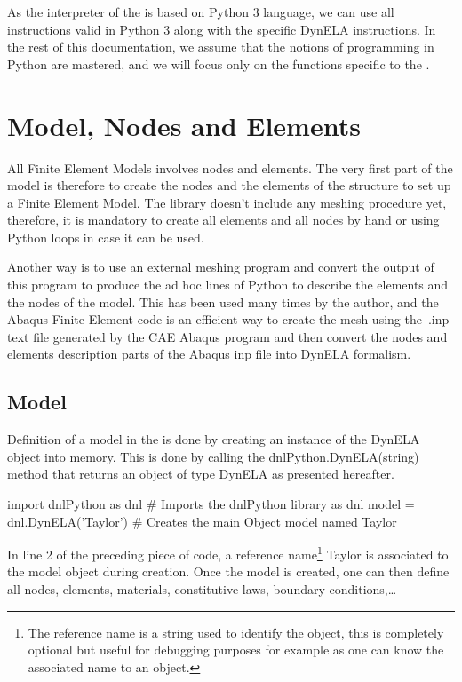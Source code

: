 As the interpreter of the \DynELA is based on Python 3 language, we can use all instructions valid in Python 3 along with the specific DynELA instructions. In the rest of this documentation, we assume that the notions of programming in Python are mastered, and we will focus only on the functions specific to the \DynELA.


\section{Model, Nodes and Elements}

All Finite Element Models involves nodes and elements. The very first part of the model is therefore to create the nodes and the elements of the structure to set up a Finite Element Model. The \DynELA library doesn't include any meshing procedure yet, therefore, it is mandatory to create all elements and all nodes by hand or using Python loops in case it can be used.

Another way is to use an external meshing program and convert the output of this program to produce the ad hoc lines of Python to describe the elements and the nodes of the model. This has been used many times by the author, and the Abaqus Finite Element code is an efficient way to create the mesh using the \textsf{.inp} text file generated by the CAE Abaqus program and then convert the nodes and elements description parts of the Abaqus inp file into DynELA formalism.

\subsection{Model}

Definition of a model in the \DynELA is done by creating an instance of the \textsf{DynELA} object into memory. This is done by calling the \textsf{dnlPython.DynELA(string)} method that returns an object of type \textsf{DynELA} as presented hereafter.

\begin{PythonListing}
import dnlPython as dnl       # Imports the dnlPython library as dnl
model = dnl.DynELA('Taylor')  # Creates the main Object model named Taylor
\end{PythonListing}

In line 2 of the preceding piece of code, a reference name\footnote{The reference name is a string used to identify the object, this is completely optional but useful for debugging purposes for example as one can know the associated name to an object.} \textsf{Taylor} is associated to the \textsf{model} object during creation. Once the model is created, one can then define all nodes, elements, materials, constitutive laws, boundary conditions,\ldots

